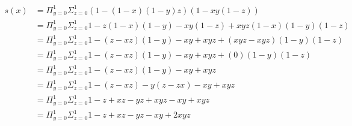 \documentclass[letterpaper,notitlepage,twoside]{article}
\begin{document}
\begin{align*}
s(x) &= \Pi_{y = 0}^1\Sigma_{z = 0}^1 (1 - (1 - x)(1 - y)z)(1 - xy(1 - z)) \\
     &= \Pi_{y = 0}^1\Sigma_{z = 0}^1 1 - z(1 - x)(1 - y) - xy(1 - z) + xyz(1 - x)(1 - y)(1 - z) \\
     &= \Pi_{y = 0}^1\Sigma_{z = 0}^1 1 - (z - xz)(1 - y) - xy + xyz + (xyz - xyz)(1 - y)(1 - z) \\
     &= \Pi_{y = 0}^1\Sigma_{z = 0}^1 1 - (z - xz)(1 - y) - xy + xyz + (0)(1 - y)(1 - z) \\
     &= \Pi_{y = 0}^1\Sigma_{z = 0}^1 1 - (z - xz)(1 - y) - xy + xyz \\
     &= \Pi_{y = 0}^1\Sigma_{z = 0}^1 1 - (z - xz) - y(z - zx) - xy + xyz \\
     &= \Pi_{y = 0}^1\Sigma_{z = 0}^1 1 - z + xz - yz + xyz - xy + xyz \\
     &= \Pi_{y = 0}^1\Sigma_{z = 0}^1 1 - z + xz - yz - xy + 2xyz \\
\end{align*}
\end{document}
